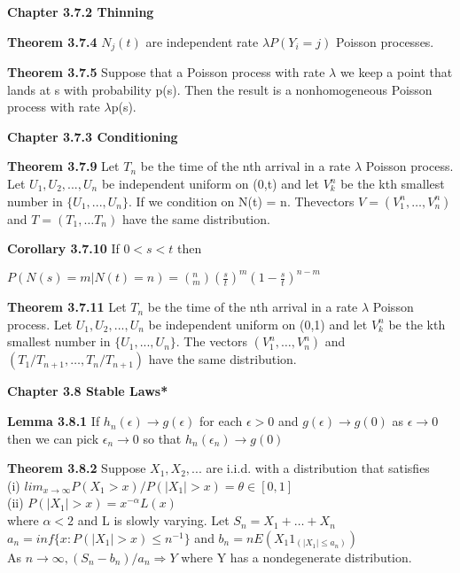 \documentclass{article}
\begin{document}
\textbf {Chapter 3.7.2 Thinning}

\textbf {Theorem 3.7.4} $N_j(t)$ are independent rate $\lambda P(Y_i = j)$ Poisson processes.

\textbf {Theorem 3.7.5} Suppose that a Poisson process with rate $\lambda$ we keep a point that lands at s with probability p(s). Then the result is a nonhomogeneous Poisson process with rate $\lambda $p(s).

\textbf {Chapter 3.7.3 Conditioning}

\textbf {Theorem 3.7.9} Let $T_n$ be the time of the nth arrival in a rate $\lambda$ Poisson process. Let $U_1 , U_2 ,..., U_n$ be independent uniform on (0,t) and let $V_k^n$ be the kth smallest number in $\{U_1 ,..., U_n\}$. If we condition on N(t) = n. Thevectors $V = (V_1^n ,\dots , V_n^n)$ and $T = (T_1 , \dots T_n)$ have the same distribution.

\textbf {Corollary 3.7.10} If $0 < s < t$ then 
\begin{center}
$P(N(s) = m|N(t) = n) = (^n_m) (\frac{s}{t})^m (1 - \frac{s}{t})^{n-m}$
\end{center}

\textbf {Theorem 3.7.11} Let $T_n$ be the time of the nth arrival in a rate $\lambda$ Poisson process. Let $U_1 , U_2 ,..., U_n$ be independent uniform on (0,1) and let $V_k^n$ be the kth smallest number in $\{U_1 ,..., U_n\}$. The vectors $(V_1^n ,\dots , V_n^n)$ and $(T_1 / T_{n+1} , \dots , T_n / T_{n+1})$ have the same distribution.

\textbf {Chapter 3.8 Stable Laws*}

\textbf {Lemma 3.8.1} If $h_n(\epsilon) \rightarrow g(\epsilon)$ for each $\epsilon > 0$ and $g(\epsilon) \rightarrow g(0)$ as $\epsilon \rightarrow 0$ then we can pick $\epsilon_n \rightarrow 0$ so that $h_n(\epsilon_n) \rightarrow g(0)$

\textbf {Theorem 3.8.2} Suppose $X_1 , X_2 ,...$ are i.i.d. with a distribution that satisfies \\
(i) $lim_{x \to \infty} P(X_1 > x) / P(|X_1| > x) = \theta \in [0,1]$ \\
(ii) $P(|X_1| > x) = x^{-\alpha} L(x)$ \\
where $\alpha < 2$ and L is slowly varying. Let $S_n = X_1 + \dots + X_n$ \\
$a_n = inf\{x : P(|X_1| > x) \leq n^{-1}\}$  and   $b_n = nE(X_1 1_{(|X_1| \leq a_n)})$ \\
As $n \to \infty, (S_n - b_n) / a_n \Rightarrow Y$ where Y has a nondegenerate distribution.
\end{document}
